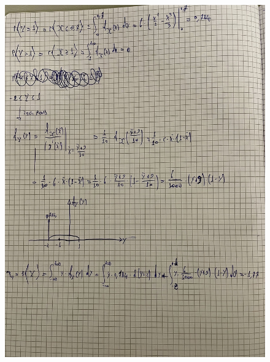 \documentclass{article}
\begin{document}
\begin{figure}[H]
\centering
\includegraphics[scale=0.10]{ese/34a.jpeg}
\end{figure}
\end{document}
